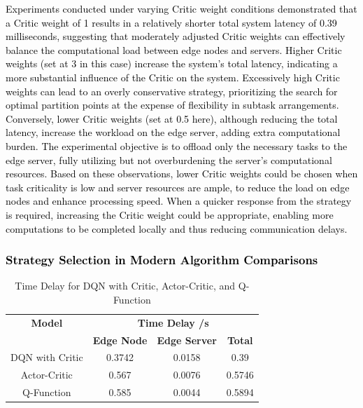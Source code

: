 \documentclass[preprint,12pt]{elsarticle}
\begin{document}
\textcolor{black}{Experiments conducted under varying Critic weight conditions demonstrated that a Critic weight of 1 results in a relatively shorter total system latency of 0.39 milliseconds, suggesting that moderately adjusted Critic weights can effectively balance the computational load between edge nodes and servers. Higher Critic weights (set at 3 in this case) increase the system's total latency, indicating a more substantial influence of the Critic on the system. Excessively high Critic weights can lead to an overly conservative strategy, prioritizing the search for optimal partition points at the expense of flexibility in subtask arrangements. Conversely, lower Critic weights (set at 0.5 here), although reducing the total latency, increase the workload on the edge server, adding extra computational burden. The experimental objective is to offload only the necessary tasks to the edge server, fully utilizing but not overburdening the server's computational resources. Based on these observations, lower Critic weights could be chosen when task criticality is low and server resources are ample, to reduce the load on edge nodes and enhance processing speed. When a quicker response from the strategy is required, increasing the Critic weight could be appropriate, enabling more computations to be completed locally and thus reducing communication delays.}

\textcolor{black}{\subsubsection{Strategy Selection in Modern Algorithm Comparisons}}

\begin{table}[ht!]
\centering
\begin{tabular}{c c c c}
\hline
\textbf{Model} & \multicolumn{3}{c}{\textbf{Time Delay /s}} \\
& \textbf{Edge Node} & \textbf{Edge Server} & \textbf{Total} \\
\hline
DQN with Critic & 0.3742 & 0.0158 & 0.39 \\
Actor-Critic & 0.567 & 0.0076 & 0.5746   \\
Q-Function & 0.585 & 0.0044 & 0.5894 \\
\hline
\end{tabular}
\caption{Time Delay for DQN with Critic, Actor-Critic, and Q-Function}
\label{tab:table 9}
\end{table}
\end{document}
